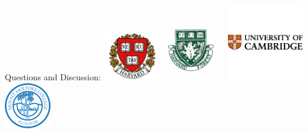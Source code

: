 \documentclass[ignorenonframetext,]{beamer}
\begin{document}
\begin{frame}{Questions and Discussion:}
\includegraphics[width=0.19\textwidth,height=\textheight]{inst_2.png}
\includegraphics[width=0.2\textwidth,height=\textheight]{inst_3.png}
\includegraphics[width=0.25\textwidth,height=\textheight]{inst_1.png}
\includegraphics[width=0.15\textwidth,height=\textheight]{inst_4.png}

\end{frame}
\end{document}
